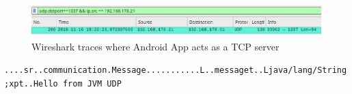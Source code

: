 \begin{figure}[H]
	\includegraphics[width=1\linewidth]{images/task3/subtask2/wireshark/androidServerUDP.png}
	\caption{Wireshark traces where Android App acts as a TCP server}
	\label{fig:wire5}
\end{figure}

\texttt{....sr..communication.Message...........L..messaget..Ljava/lang/String;xpt..Hello from JVM UDP}
